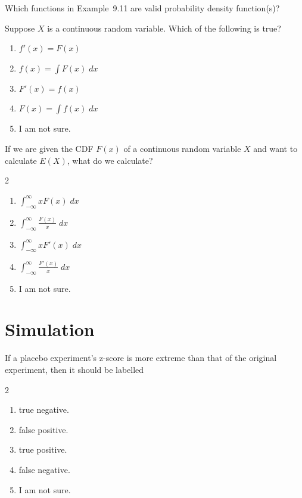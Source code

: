 \documentclass[aspectratio=169, t, 14pt]{beamer}
\begin{document}
\begin{poll}[c]
  Which functions in Example~9.11 are valid probability density function(s)?

\end{poll}

\begin{frame}
  Suppose \(X\) is a continuous random variable. Which of the following is true?

  \begin{enumerate}
    \item \(f'(x) = F(x)\)
    \item \(f(x) = \int F(x) \;dx\)
    \item \(F'(x) = f(x)\)
    \item \(F(x) = \int f(x) \;dx\)
    \item I am not sure.
  \end{enumerate}
\end{frame}


\begin{frame}
  If we are given the CDF \(F(x)\) of a continuous random variable \(X\) and want to calculate \(E(X)\), what do we calculate?

  \begin{multicols}{2}
    \begin{enumerate}
      \item \(\int_{-\infty}^{\infty} x F(x) \;dx\)
      \item \(\int_{-\infty}^{\infty} \frac{F(x)}{x} \;dx\)
      \item \(\int_{-\infty}^{\infty} x F'(x) \;dx\)
      \item \(\int_{-\infty}^{\infty} \frac{F'(x)}{x} \;dx\)
        \columnbreak
      \item I am not sure.
    \end{enumerate}
  \end{multicols}
\end{frame}


\section{Simulation}

\begin{poll}
  If a placebo experiment's z-score is more extreme than that of the original experiment, then it should be labelled

  \begin{multicols}{2}
    \begin{enumerate}
      \item true negative.
      \item false positive.
      \item true positive.
      \item false negative.
        \columnbreak
      \item I am not sure.
    \end{enumerate}
  \end{multicols}
\end{poll}
\end{document}
